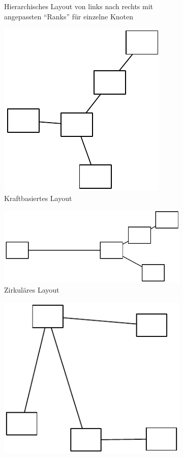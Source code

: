 \begin{figure}[hbt]
\begin{subfigure}{\subfigureshortwidth}
        \caption{Hierarchisches Layout von links nach rechts mit angepassten \enquote{Ranks} für einzelne Knoten}
        \label{fig:omnigraffle-automatic-layout-c}
    \end{subfigure}
    \begin{subfigure}{\subfigureshortwidth}
        \centering
        \includegraphics[scale=\graphicsscale]{assets/omnigraffle-automatic-layout-d}
        \caption{Kraftbasiertes Layout}
        \label{fig:omnigraffle-automatic-layout-d}
    \end{subfigure}
    \begin{subfigure}{\subfigurelongwidth}
        \centering
        \includegraphics[scale=\graphicsscale]{assets/omnigraffle-automatic-layout-e}
        \caption{Zirkuläres Layout}
        \label{fig:omnigraffle-automatic-layout-e}
    \end{subfigure}
    \begin{subfigure}{\subfigureshortwidth}
        \centering
        \includegraphics[scale=\graphicsscale]{assets/omnigraffle-automatic-layout-f}

\end{subfigure}
\end{figure}

